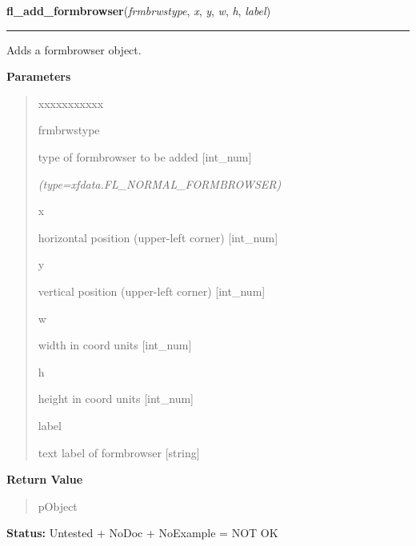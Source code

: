 \hspace{.8\funcindent}\begin{boxedminipage}{\funcwidth}

    \raggedright \textbf{fl\_add\_formbrowser}(\textit{frmbrwstype}, \textit{x}, \textit{y}, \textit{w}, \textit{h}, \textit{label})

    \vspace{-1.5ex}

    \rule{\textwidth}{0.5\fboxrule}
\setlength{\parskip}{2ex}
    Adds a formbrowser object.

\setlength{\parskip}{1ex}
      \textbf{Parameters}
      \vspace{-1ex}

      \begin{quote}
        \begin{Ventry}{xxxxxxxxxxx}

          \item[frmbrwstype]

          type of formbrowser to be added [int\_num]

            {\it (type=xfdata.FL\_NORMAL\_FORMBROWSER)}

          \item[x]

          horizontal position (upper-left corner) [int\_num]

          \item[y]

          vertical position (upper-left corner) [int\_num]

          \item[w]

          width in coord units [int\_num]

          \item[h]

          height in coord units [int\_num]

          \item[label]

          text label of formbrowser [string]

        \end{Ventry}

      \end{quote}

      \textbf{Return Value}
    \vspace{-1ex}

      \begin{quote}
      pObject

      \end{quote}

\textbf{Status:} Untested + NoDoc + NoExample = NOT OK



    \end{boxedminipage}

